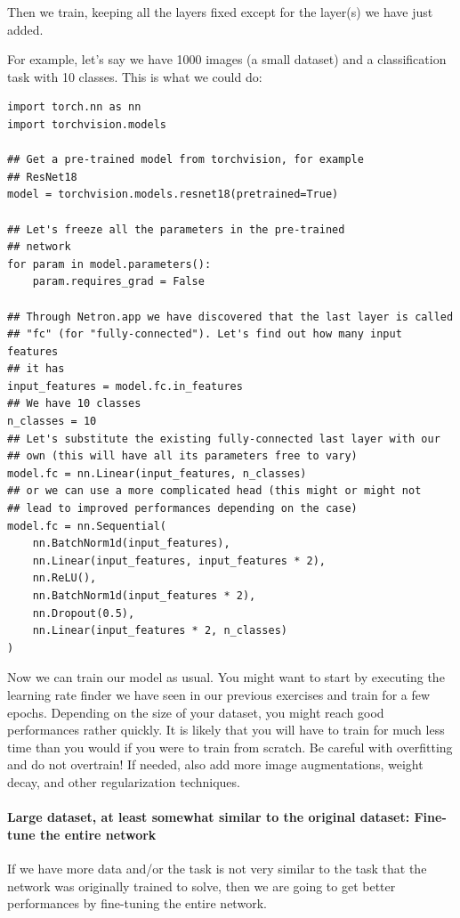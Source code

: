 Then we train, keeping all the layers fixed except for the layer(s) we have just added.

For example, let's say we have 1000 images (a small dataset) and a classification task with 10 classes. This is what we could do:
\begin{lstlisting}
import torch.nn as nn
import torchvision.models

## Get a pre-trained model from torchvision, for example
## ResNet18
model = torchvision.models.resnet18(pretrained=True)

## Let's freeze all the parameters in the pre-trained
## network
for param in model.parameters():
    param.requires_grad = False

## Through Netron.app we have discovered that the last layer is called
## "fc" (for "fully-connected"). Let's find out how many input features
## it has
input_features = model.fc.in_features
## We have 10 classes
n_classes = 10
## Let's substitute the existing fully-connected last layer with our
## own (this will have all its parameters free to vary)
model.fc = nn.Linear(input_features, n_classes)
## or we can use a more complicated head (this might or might not
## lead to improved performances depending on the case)
model.fc = nn.Sequential(
    nn.BatchNorm1d(input_features),
    nn.Linear(input_features, input_features * 2),
    nn.ReLU(),
    nn.BatchNorm1d(input_features * 2),
    nn.Dropout(0.5),
    nn.Linear(input_features * 2, n_classes)
)
\end{lstlisting}
Now we can train our model as usual. You might want to start by executing the learning rate finder we have seen in our previous exercises and train for a few epochs. Depending on the size of your dataset, you might reach good performances rather quickly. It is likely that you will have to train for much less time than you would if you were to train from scratch. Be careful with overfitting and do not overtrain! If needed, also add more image augmentations, weight decay, and other regularization techniques.

\paragraph{Large dataset, at least somewhat similar to the original dataset: Fine-tune the entire network}

If we have more data and/or the task is not very similar to the task that the network was originally trained to solve, then we are going to get better performances by fine-tuning the entire network.\newline

